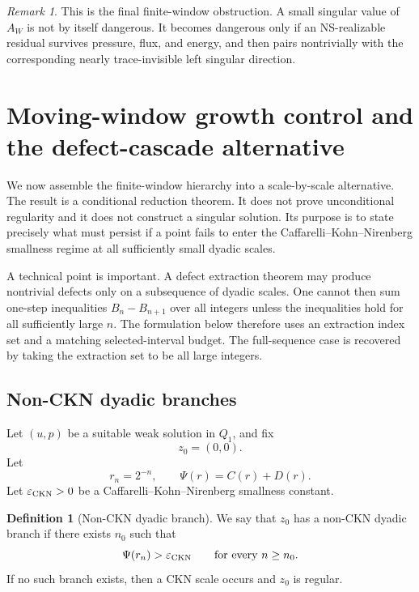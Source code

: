 \documentclass[11pt]{article}
\numberwithin{equation}{section}
\theoremstyle{plain}
\theoremstyle{definition}
\newtheorem{definition}[theorem]{Definition}
\theoremstyle{remark}
\newtheorem{remark}[theorem]{Remark}
\begin{document}
\begin{remark}
This is the final finite-window obstruction.  A small singular value of
\(A_W\) is not by itself dangerous.  It becomes dangerous only if an
NS-realizable residual survives pressure, flux, and energy, and then pairs
nontrivially with the corresponding nearly trace-invisible left singular
direction.
\end{remark}


\section{Moving-window growth control and the defect-cascade alternative}
\label{sec:moving-window-alternative}

We now assemble the finite-window hierarchy into a scale-by-scale alternative.
The result is a conditional reduction theorem.  It does not prove unconditional
regularity and it does not construct a singular solution.  Its purpose is to
state precisely what must persist if a point fails to enter the
Caffarelli--Kohn--Nirenberg smallness regime at all sufficiently small dyadic
scales.

A technical point is important.  A defect extraction theorem may produce
nontrivial defects only on a subsequence of dyadic scales.  One cannot then sum
one-step inequalities \(B_n-B_{n+1}\) over all integers unless the inequalities
hold for all sufficiently large \(n\).  The formulation below therefore uses an
extraction index set and a matching selected-interval budget.  The full-sequence
case is recovered by taking the extraction set to be all large integers.

\subsection{Non-CKN dyadic branches}

Let \((u,p)\) be a suitable weak solution in \(Q_1\), and fix
\[
        z_0=(0,0).
\]
Let
\[
        r_n=2^{-n},
        \qquad
        \Psi(r)=C(r)+D(r).
\]
Let \(\varepsilon_{\rm CKN}>0\) be a Caffarelli--Kohn--Nirenberg smallness
constant.

\begin{definition}[Non-CKN dyadic branch]
\label{def:non-ckn-branch}
We say that \(z_0\) has a non-CKN dyadic branch if there exists \(n_0\) such
that
\begin{equation}
        \Psi(r_n)>\varepsilon_{\rm CKN}
        \qquad
        \text{for every } n\ge n_0 .
        \label{eq:non-ckn-branch}
\end{equation}
If no such branch exists, then a CKN scale occurs and \(z_0\) is regular.
\end{definition}
\end{document}
